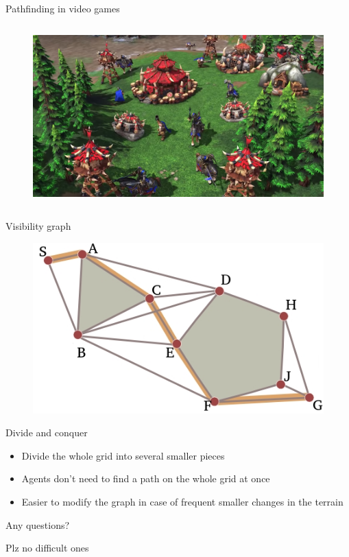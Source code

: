 \documentclass{beamer}
\begin{document}
\begin{frame}{Pathfinding in video games}
{\begin{columns}[T]
			\begin{column}{.70\textwidth}
				\begin{figure}
				\centering
					\includegraphics[width=\linewidth]{warcraft_grid.jpg}
				\end{figure}
			\end{column}
		\end{columns}
	}
\end{frame}

\begin{frame}{Visibility graph}
	\begin{figure}
	\centering
		\includegraphics[width=\linewidth]{visibility_graph.jpg}
	\end{figure}
\end{frame}

\begin{frame}{Divide and conquer}
	\begin{itemize}
		\item Divide the whole grid into several smaller pieces
		\item Agents don't need to find a path on the whole grid at once
		\item Easier to modify the graph in case of frequent smaller changes in the terrain
	\end{itemize}
\end{frame}

\begin{frame}
	\centering
	Any questions?
	
	{\tiny Plz no difficult ones}
\end{frame}
\end{document}
